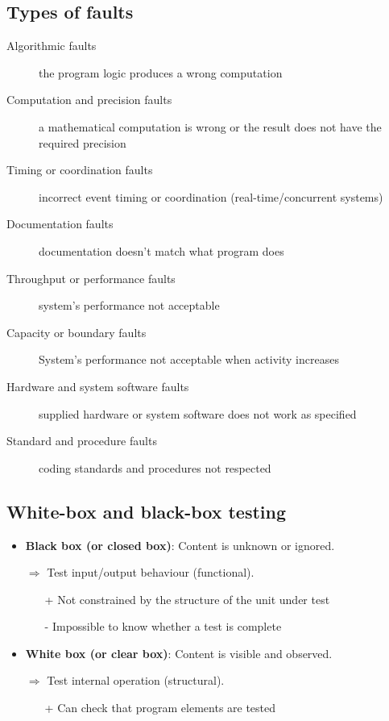 \subsection{Types of faults}

\begin{description}
    \item[Algorithmic faults] the program logic produces a wrong computation
    \item[Computation and precision faults] a mathematical computation is wrong or the
    result does not have the required precision
    \item[Timing or coordination faults] incorrect event timing or
        coordination (real-time/concurrent systems)
    \item[Documentation faults] documentation doesn't match what program does
    \item[Throughput or performance faults] system's performance not acceptable
    \item[Capacity or boundary faults] System's performance not acceptable when activity
    increases
    \item[Hardware and system software faults] supplied hardware or system software does
    not work as specified
    \item[Standard and procedure faults] coding standards and procedures not respected
\end{description}

\subsection{White-box and black-box testing}

\begin{itemize}
    \item \textbf{Black box (or closed box)}: Content is unknown or ignored. 

        $\Rightarrow$ Test input/output behaviour (functional).

        \begin{itemize}
            \item[+] Not constrained by the structure of the unit under test
            \item[-] Impossible to know whether a test is complete
        \end{itemize}

    \item \textbf{White box (or clear box)}: Content is visible and observed. 

        $\Rightarrow$ Test internal operation (structural).

        \begin{itemize}
            \item[+] Can check that program elements are tested
        \end{itemize}
\end{itemize}
